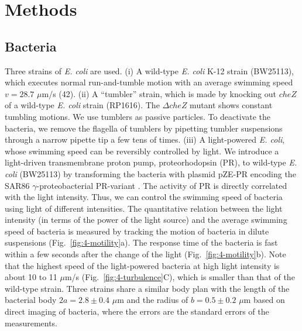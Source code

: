 \section{Methods}

\subsection{Bacteria}
Three strains of \textit{E. coli} are used. (i) A wild-type \textit{E. coli} K-12 strain (BW25113), which executes normal run-and-tumble motion with an average swimming speed $v = 28.7$ $\mu$m/s (42). (ii) A ``tumbler'' strain, which is made by knocking out $cheZ$ of a wild-type \textit{E. coli} strain (RP1616). The $\Delta cheZ$ mutant shows constant tumbling motions. We use tumblers as passive particles. To deactivate the bacteria, we remove the flagella of tumblers by pipetting tumbler suspensions through a narrow pipette tip a few tens of times. (iii) A light-powered \textit{E. coli}, whose swimming speed can be reversibly controlled by light. We introduce a light-driven transmembrane proton pump, proteorhodopsin (PR), to wild-type \textit{E. coli} (BW25113) by transforming the bacteria with plasmid pZE-PR encoding the SAR86 $\gamma$-proteobacterial PR-variant \cite{Walter2007}. The activity of PR is directly correlated with the light intensity. Thus, we can control the swimming speed of bacteria using light of different intensities. The quantitative relation between the light intensity (in terms of the power of the light source) and the average swimming speed of bacteria is measured by tracking the motion of bacteria in dilute suspensions (Fig.~\ref{fig:4-motility}a). The response time of the bacteria is fast within a few seconds after the change of the light (Fig.~\ref{fig:4-motility}b). Note that the highest speed of the light-powered bacteria at high light intensity is about 10 to 11 $\mu$m/s (Fig.~\ref{fig:4-turbulence}C), which is smaller than that of the wild-type strain.
Three strains share a similar body plan with the length of the bacterial body $2a = 2.8 \pm 0.4$ $\mu$m and the radius of $b = 0.5 \pm 0.2$ $\mu$m based on direct imaging of bacteria, where the errors are the standard errors of the measurements.

